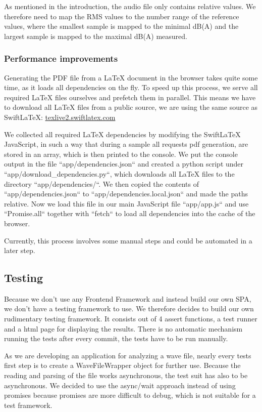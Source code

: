 As mentioned in the introduction, the audio file only contains relative values.
We therefore need to map the RMS values to the number range of the reference values, where the smallest sample is mapped to the minimal dB(A) and the largest sample is mapped to the maximal dB(A) measured.

\subsubsection{Performance improvements}
Generating the PDF file from a LaTeX document in the browser takes quite some time, as it loads all dependencies
on the fly.
To speed up this process, we serve all required LaTeX files ourselves and prefetch them in parallel.
This means we have to download all LaTeX files from a public source, we are using the same source as SwiftLaTeX:
\href{https://texlive2.swiftlatex.com/}{texlive2.swiftlatex.com}

We collected all required LaTeX dependencies by modifying the SwiftLaTeX JavaScript, in such a way that during a sample
all requests pdf generation, are stored in an array, which is then printed to the console.
We put the console output in the file ``app/dependencies.json`` and created a python script under ``app/download\_dependencies.py``,
which downloads all LaTeX files to the directory ``app/dependencies/``.
We then copied the contents of ``app/dependencies.json`` to ``app/dependencies.local.json`` and made the paths relative.
Now we load this file in our main JavaScript file ``app/app.js`` and use ``Promise.all`` together with ``fetch`` to load
all dependencies into the cache of the browser.

Currently, this process involves some manual steps and could be automated in a later step.

\subsection{Testing}
Because we don't use any Frontend Framework and instead build our own SPA, we don't have a testing framework to use. We therefore decides to build 
our own rudimentary testing framework. It consists out of 4 assert functions, a test runner and a html page for displaying the results.
There is no automatic mechanism running the tests after every commit, the tests have to be run manually. 

As we are developing an application for analyzing a wave file, nearly every tests first step is to create a WaveFileWrapper object for further use. Because the reading and parsing of the file works asynchronous, the test suit has also to be asynchronous. We decided to use the async/wait approach instead of using promises because promises are more difficult to debug, which is not suitable for a test framework.

